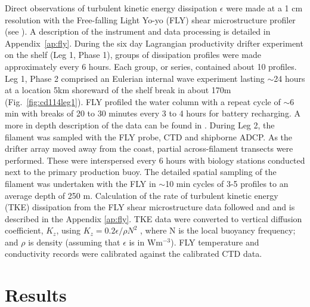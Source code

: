 Direct observations of turbulent kinetic energy dissipation
$\epsilon$ were made at a 1 cm resolution with the Free-falling
Light Yo-yo (FLY) shear microstructure profiler (see
\citet{Dewey87}). A description of the instrument and data
processing is detailed in Appendix~\ref{ap:fly}. During the six
day Lagrangian productivity drifter experiment on the shelf (Leg
1, Phase 1), groups of dissipation profiles were made
approximately every 6 hours.  Each group, or series, contained
about 10 profiles.  Leg 1, Phase 2 comprised an Eulerian internal
wave experiment lasting $\sim$24 hours at a location 5km shoreward
of the shelf break in about 170m (Fig.~\ref{fig:cd114leg1}).  FLY
profiled the water column with a repeat cycle of $\sim$6 min with
breaks of 20 to 30 minutes every 3 to 4 hours for battery
recharging. A more in depth description of the data can be found
in \citet{Barton01}. During Leg 2, the filament was sampled with
the FLY probe, CTD and shipborne ADCP. As the drifter array moved
away from the coast, partial across-filament transects were
performed. These were interspersed every 6 hours with biology
stations conducted next to the primary production buoy. The
detailed spatial sampling of the filament was undertaken with the
FLY in $\sim$10 min cycles of 3-5 profiles to an average depth of
250 m. Calculation of the rate of turbulent kinetic energy (TKE)
dissipation from the FLY shear microstructure data followed
\citet{Dewey87} and \citet{Inall98} and is described in the
Appendix \ref{ap:fly}. TKE data were converted to vertical
diffusion coefficient, $K_z$, using $K_z=0.2\epsilon /\rho N^2$
\citep{Osborn80}, where N is the local buoyancy frequency; and
$\rho$ is density (assuming that $\epsilon$ is in
$\mathrm{Wm^{-3}}$). FLY temperature and conductivity records were
calibrated against the calibrated CTD data.
\section{Results}
